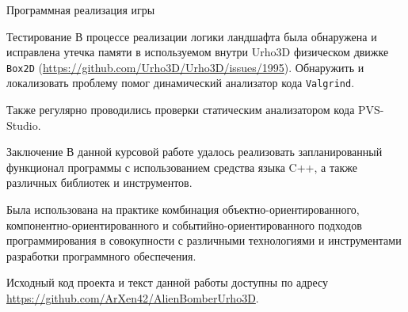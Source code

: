 \begin{section}{Программная реализация игры}
\begin{subsection}{Тестирование}
			В процессе реализации логики ландшафта была обнаружена и исправлена утечка памяти в используемом внутри Urho3D физическом движке \verb|Box2D| (\url{https://github.com/Urho3D/Urho3D/issues/1995}).
			Обнаружить и локализовать проблему помог динамический анализатор кода \verb|Valgrind|.

			Также регулярно проводились проверки статическим анализатором кода PVS-Studio.
		\end{subsection}

	\end{section}

	\begin{anonsection}{Заключение}
		В данной курсовой работе удалось реализовать запланированный функционал программы с использованием средства языка C++, а также различных библиотек и инструментов.

		Была использована на практике комбинация объектно-ориентированного, компонентно-ориентированного и событийно-ориентированного подходов программирования в совокупности с различными технологиями и инструментами разработки программного обеспечения.

		Исходный код проекта и текст данной работы доступны по адресу \url{https://github.com/ArXen42/AlienBomberUrho3D}.
	\end{anonsection}

	\printbibliography[title = Список использованных источников]



